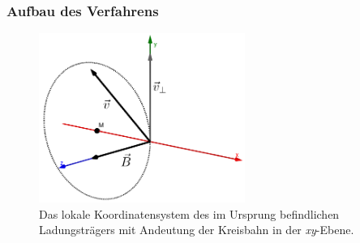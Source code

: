 \mode*

\begin{frame}
  \frametitle{Aufbau des Verfahrens}
  \begin{figure}
    \centering
    \includegraphics[width=0.6\textwidth]{../geogebra/img/local_movement_edited}
    \caption{Das lokale Koordinatensystem des im Ursprung befindlichen Ladungstr\"agers mit Andeutung der Kreisbahn in der
      \textit{xy}-Ebene.}
    \label{fig:locale_movement}
  \end{figure}
\end{frame}

